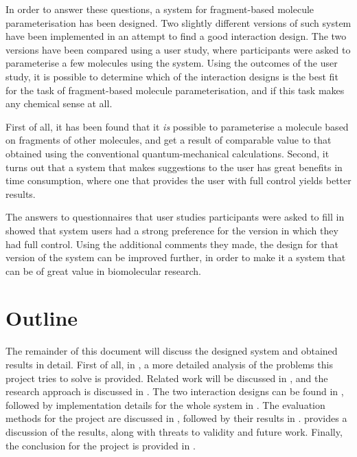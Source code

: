 In order to answer these questions, a system for fragment-based molecule parameterisation has been designed. Two slightly different versions of such system have been implemented in an attempt to find a good interaction design. The two versions have been compared using a user study, where participants were asked to parameterise a few molecules using the system. Using the outcomes of the user study, it is possible to determine which of the interaction designs is the best fit for the task of fragment-based molecule parameterisation, and if this task makes any chemical sense at all.

First of all, it has been found that it \emph{is} possible to parameterise a molecule based on fragments of other molecules, and get a result of comparable value to that obtained using the conventional quantum-mechanical calculations. Second, it turns out that a system that makes suggestions to the user has great benefits in time consumption, where one that provides the user with full control yields better results.

The answers to questionnaires that user studies participants were asked to fill in showed that system users had a strong preference for the version in which they had full control. Using the additional comments they made, the design for that version of the system can be improved further, in order to make it a system that can be of great value in biomolecular research.

\section{Outline}
The remainder of this document will discuss the designed system and obtained results in detail. First of all, in , a more detailed analysis of the problems this project tries to solve is provided. Related work will be discussed in , and the research approach is discussed in . The two interaction designs can be found in , followed by implementation details for the whole system in . The evaluation methods for the project are discussed in , followed by their results in .  provides a discussion of the results, along with threats to validity and future work. Finally, the conclusion for the project is provided in .
